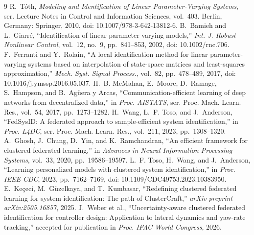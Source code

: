 \documentclass[conference]{IEEEtran}
\begin{document}
\begin{thebibliography}{9}
R.~T\'oth, \emph{Modeling and Identification of Linear Parameter-Varying
Systems}, ser. Lecture Notes in Control and Information Sciences, vol.~403.
Berlin, Germany: Springer, 2010, doi: 10.1007/978-3-642-13812-6.
B.~Bamieh and L.~Giarr\'e, ``Identification of linear parameter varying
models,'' \emph{Int. J. Robust Nonlinear Control}, vol.~12, no.~9,
pp.~841--853, 2002, doi: 10.1002/rnc.706.
F.~Ferranti and Y.~Rolain, ``A local identification method for linear
parameter-varying systems based on interpolation of state-space matrices
and least-squares approximation,'' \emph{Mech. Syst. Signal Process.},
vol.~82, pp.~478--489, 2017, doi: 10.1016/j.ymssp.2016.05.037.
H.~B. McMahan, E.~Moore, D.~Ramage, S.~Hampson, and B.~Ag\"uera y Arcas,
``Communication-efficient learning of deep networks from decentralized data,''
in \emph{Proc. AISTATS}, ser. Proc. Mach. Learn. Res., vol.~54,
2017, pp.~1273--1282.
H.~Wang, L.~F. Toso, and J.~Anderson, ``FedSysID: A federated approach to
sample-efficient system identification,'' in \emph{Proc. L4DC},
ser. Proc. Mach. Learn. Res., vol.~211, 2023, pp.~1308--1320.
A.~Ghosh, J.~Chung, D.~Yin, and K.~Ramchandran, ``An efficient framework
for clustered federated learning,'' in \emph{Advances in Neural Information
Processing Systems}, vol.~33, 2020, pp.~19586--19597.
L.~F. Toso, H.~Wang, and J.~Anderson, ``Learning personalized models with
clustered system identification,'' in \emph{Proc. IEEE CDC}, 2023,
pp.~7162--7169, doi: 10.1109/CDC49753.2023.10383950.
E.~Ke\c{c}eci, M.~G\"uzelkaya, and T.~Kumbasar, ``Redefining clustered
federated learning for system identification: The path of ClusterCraft,''
\emph{arXiv preprint arXiv:2505.16857}, 2025.
J.~Weber et al., ``Uncertainty-aware clustered federated identification for
controller design: Application to lateral dynamics and yaw-rate tracking,''
accepted for publication in \emph{Proc. IFAC World Congress}, 2026.
\end{thebibliography}
\end{document}
